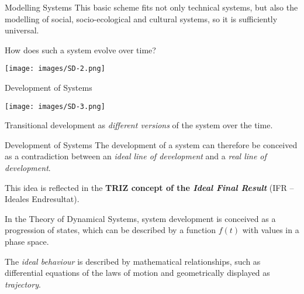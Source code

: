 \documentclass{beamer}
\begin{document}
\begin{frame}{Modelling Systems}
  This basic scheme fits not only technical systems, but also the modelling of
  social, socio-ecological and cultural systems, so it is sufficiently
  universal.

How does such a system evolve over time?
\begin{center}
  \texttt{[image: images/SD-2.png]}
\end{center}
\end{frame}

\begin{frame}{Development of Systems}
\begin{center}
  \texttt{[image: images/SD-3.png]}
\end{center}
Transitional development as \emph{different versions} of the system over the
time.
\end{frame}


\begin{frame}{Development of Systems}
  The development of a system can therefore be conceived as a contradiction
  between an \emph{ideal line of development} and a \emph{real line of
    development}.

This idea is reflected in the \textbf{TRIZ concept of the \emph{Ideal Final
    Result}} (IFR -- Ideales Endresultat).

In the Theory of Dynamical Systems, system development is conceived as a
progression of states, which can be described by a function $f(t)$ with values
in a phase space.

The \emph{ideal behaviour} is described by mathematical relationships, such as
differential equations of the laws of motion and geometrically displayed as
\emph{trajectory}. 

\end{frame}
\end{document}
